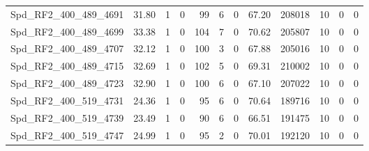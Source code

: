\begin{longtable}[c]{@{}lrrrrrrrrrrr@{}}
Spd\_RF2\_400\_489\_4691      & 31.80                  & 1                       & 0                       & 99                     & 6                       & 0                       & 67.20                   & 208018                   & 10                       & 0                        & 0                        \\
Spd\_RF2\_400\_489\_4699      & 33.38                  & 1                       & 0                       & 104                    & 7                       & 0                       & 70.62                   & 205807                   & 10                       & 0                        & 0                        \\
Spd\_RF2\_400\_489\_4707      & 32.12                  & 1                       & 0                       & 100                    & 3                       & 0                       & 67.88                   & 205016                   & 10                       & 0                        & 0                        \\
Spd\_RF2\_400\_489\_4715      & 32.69                  & 1                       & 0                       & 102                    & 5                       & 0                       & 69.31                   & 210002                   & 10                       & 0                        & 0                        \\
Spd\_RF2\_400\_489\_4723      & 32.90                  & 1                       & 0                       & 100                    & 6                       & 0                       & 67.10                   & 207022                   & 10                       & 0                        & 0                        \\
Spd\_RF2\_400\_519\_4731      & 24.36                  & 1                       & 0                       & 95                     & 6                       & 0                       & 70.64                   & 189716                   & 10                       & 0                        & 0                        \\
Spd\_RF2\_400\_519\_4739      & 23.49                  & 1                       & 0                       & 90                     & 6                       & 0                       & 66.51                   & 191475                   & 10                       & 0                        & 0                        \\
Spd\_RF2\_400\_519\_4747      & 24.99                  & 1                       & 0                       & 95                     & 2                       & 0                       & 70.01                   & 192120                   & 10                       & 0                        & 0                        \\

\end{longtable}
